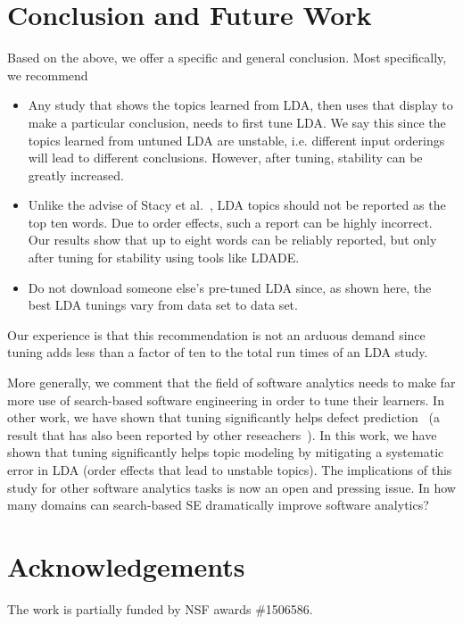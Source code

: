 \documentclass[10pt,conference]{IEEEtran}
\newcommand{\bi}{\begin{itemize}}
\newcommand{\ei}{\end{itemize}}
\theoremstyle{break}
\begin{document}
\section{Conclusion and Future Work}

Based on the above, we offer a specific and general conclusion. Most specifically, we recommend 
\bi
\item  
Any study that shows the topics learned from LDA, then uses that display to make a particular
conclusion, needs to first tune LDA. We say this since the topics learned from untuned LDA are unstable, i.e. different input orderings will lead to different conclusions.
However, after tuning, stability can be greatly increased.
\item Unlike the advise of Stacy et al.~\cite{lukins2010bug}, LDA topics should not be reported as the top ten words.
  Due to order effects, such a report can be highly incorrect.
  Our results show that up to eight words can be reliably reported, but only
  after tuning for stability using tools like LDADE.
\item Do not download someone else's pre-tuned LDA since, as shown here,  the best LDA tunings vary from data set to data set.
\ei
Our experience is that this recommendation is not an arduous demand since tuning adds less than a factor of ten to the total run times of an LDA study.


More generally, we comment that the field of software analytics needs to make far more use of search-based software engineering in order
to tune their learners. In other work, we have shown that tuning significantly helps defect prediction~\cite{fu2016tuning} (a result that has also been reported by
other reseachers~\cite{panichella2013effectively}). In this work, we have shown that tuning significantly helps topic modeling by mitigating a systematic error in LDA  (order effects that lead to unstable topics). The implications of this study for other software analytics tasks is now an open
and pressing issue. 
In how many domains can search-based SE dramatically improve software analytics?


	\section*{Acknowledgements}
		The work is partially funded by NSF  awards \#1506586.
		



\medskip

\balance

\end{document}

